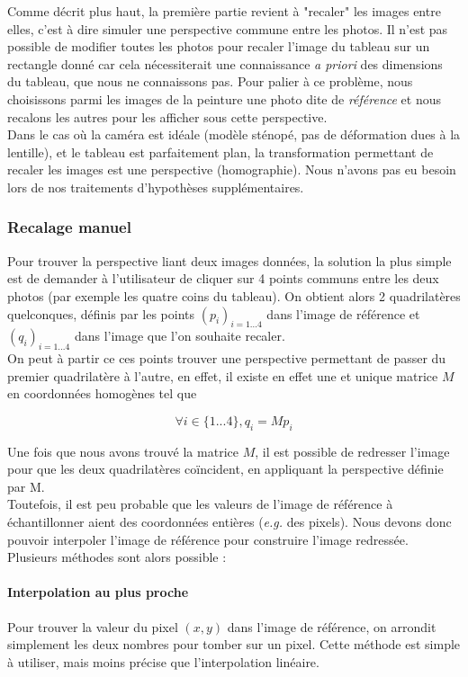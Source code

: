 \documentclass[12pt,a4paper]{article}
\begin{document}
Comme décrit plus haut, la première partie revient à "recaler" les images entre elles, c'est à dire simuler une perspective commune entre les photos. Il n'est pas possible de modifier toutes les photos pour recaler l'image du tableau sur un rectangle donné car cela nécessiterait une connaissance \emph{a priori} des dimensions du tableau, que nous ne connaissons pas. Pour palier à ce problème, nous choisissons parmi les images de la peinture une photo dite de \emph{référence} et nous recalons les autres pour les afficher sous cette perspective.\\

Dans le cas où la caméra est idéale (modèle sténopé, pas de déformation dues à la lentille), et le tableau est parfaitement plan, la transformation permettant de recaler les images est une perspective (homographie). Nous n'avons pas eu besoin lors de nos traitements d'hypothèses supplémentaires.

\subsubsection{Recalage manuel}
Pour trouver la perspective liant deux images données, la solution la plus simple est de demander à l'utilisateur de cliquer sur 4 points communs entre les deux photos (par exemple les quatre coins du tableau). On obtient alors 2 quadrilatères quelconques, définis par les points $(p_i)_{i = 1...4}$ dans l'image de référence et $(q_i)_{i = 1...4}$ dans l'image que l'on souhaite recaler. \\
On peut à partir ce ces points trouver une perspective permettant de passer du premier quadrilatère à l'autre, en effet, il existe en effet une et unique matrice $M$ en coordonnées homogènes tel que

$$ \forall i \in \{1...4\}, q_i = M p_i $$

Une fois que nous avons trouvé la matrice $M$, il est possible de redresser l'image pour que les deux quadrilatères coïncident, en appliquant la perspective définie par M. \\
Toutefois, il est peu probable que les valeurs de l'image de référence à échantillonner aient des coordonnées entières (\emph{e.g.} des pixels). Nous devons donc pouvoir interpoler l'image de référence pour construire l'image redressée. Plusieurs méthodes sont alors possible :
\paragraph{Interpolation au plus proche}
Pour trouver la valeur du pixel $(x,y)$ dans l'image de référence, on arrondit simplement les deux nombres pour tomber sur un pixel. Cette méthode est simple à utiliser, mais moins précise que l'interpolation linéaire.
\end{document}
